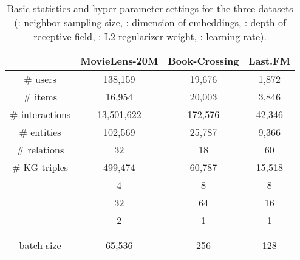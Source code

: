 \documentclass[sigconf]{acmart}
\begin{document}
		\begin{table}[t]
			\centering
			\setlength{\tabcolsep}{5pt}
			\caption{Basic statistics and hyper-parameter settings for the three datasets (: neighbor sampling size, : dimension of embeddings, : depth of receptive field, : L2 regularizer weight, : learning rate).}
			\begin{tabular}{c|ccc}
				\hline
				& MovieLens-20M & Book-Crossing & Last.FM\\
				\hline
				\# users & 138,159 & 19,676 & 1,872\\
				\# items & 16,954 & 20,003 & 3,846\\
				\# interactions & 13,501,622 & 172,576 & 42,346\\
				\# entities & 102,569 & 25,787 & 9,366\\
				\# relations & 32 & 18 & 60\\
				\# KG triples & 499,474 & 60,787 & 15,518\\
				\hline
				 & 4 & 8 & 8\\
				 & 32 & 64 & 16\\
				 & 2 & 1 & 1\\
				 &  &  & \\
				 &  &  & \\
				batch size & 65,536 & 256 & 128\\
				\hline
			\end{tabular}
			\label{table:statistics}
		\end{table}
		
\end{document}
